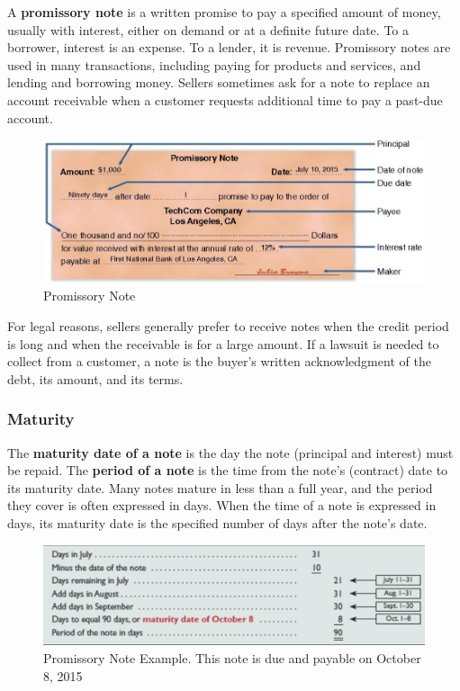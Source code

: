 \documentclass[../main.tex]{subfiles}
\begin{document}
	A \textbf{promissory note} is a written promise to pay a specified amount 
	of money, usually with interest, either on demand or at a definite future 
	date. To a borrower, interest is an expense. To a lender, it is revenue. 
	Promissory notes are used in many transactions, including paying for 
	products and services, and lending and borrowing money. Sellers sometimes 
	ask for a note to replace an account receivable when a customer requests 
	additional time to pay a past-due account. 
	
	\begin{figure}[ht]
		\centering
		\includegraphics[width=\columnwidth]{images/c6/promissory_note.png}
		\caption{Promissory Note}
	\end{figure}
	
	For legal reasons, sellers 
	generally prefer to receive notes when the credit period is long and when 
	the receivable is for a large amount. If a lawsuit is needed to collect 
	from a customer, a note is the buyer’s written acknowledgment of the debt, 
	its amount, and its terms.
	
	\subsubsection{Maturity}
	
	The \textbf{maturity date of a note} is the day the note (principal and 
	interest) 
	must be repaid. The \textbf{period of a note} is the time from the note’s 
	(contract) 
	date to its maturity date. Many notes mature in less than a full year, and 
	the period they cover is often expressed in days. When the time of a note 
	is expressed in days, its maturity date is the specified number of days 
	after the note’s date. 
	
	\begin{figure}[ht]
		\centering
		\includegraphics[width=\columnwidth]{images/c6/notes_receivable_example.png}
		\caption{Promissory Note Example. This note is due and payable on 
		October 8, 2015}
	\end{figure}
\end{document}
